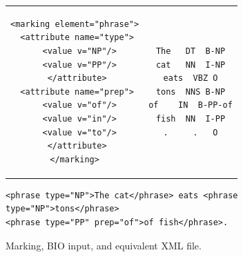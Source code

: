 \documentclass{article}
\begin{document}
\begin{figure}[tb]
\begin{center}
\begin{tabular}{cc}
\begin{minipage}{.4\linewidth}
\begin{verbatim}
<marking element="phrase">
 <attribute name="type">
  <value v="NP"/>
  <value v="PP"/>
 </attribute>
 <attribute name="prep">
  <value v="of"/>
  <value v="in"/>
  <value v="to"/>
 </attribute>
</marking>
\end{verbatim}
\end{minipage}
&
\begin{minipage}{.3\linewidth}
\begin{verbatim}
The   DT  B-NP
cat   NN  I-NP
eats  VBZ O
tons  NNS B-NP
of    IN  B-PP-of
fish  NN  I-PP
.     .   O

\end{verbatim}
\end{minipage}
\end{tabular}

\vspace{1cm}

\begin{minipage}{.9\linewidth}
\begin{verbatim}
<phrase type="NP">The cat</phrase> eats <phrase type="NP">tons</phrase>
<phrase type="PP" prep="of">of fish</phrase>.
\end{verbatim}
\end{minipage}
\end{center}
\caption{Marking, BIO input, and equivalent XML file.}
\label{fig:bio}
\end{figure}
\end{document}

